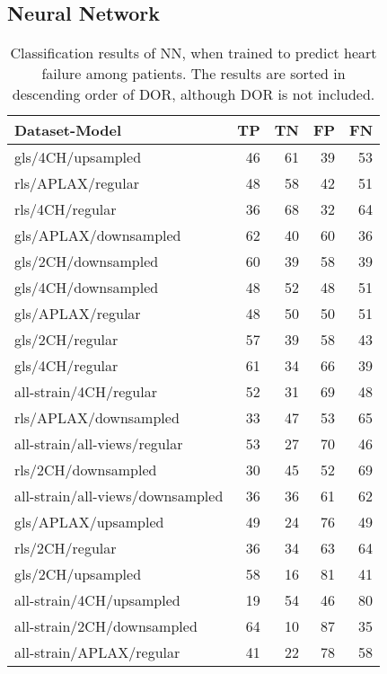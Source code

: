 \subsection{Neural Network}

\begin{longtable}{lrrrr}
    \caption{Classification results of NN, when trained to predict heart failure among patients.
             The results are sorted in descending order of DOR, although DOR is not included.}
    \label{tab:dl_hf_raw_results}\\
    \hline
    Dataset-Model                    & TP & TN & FP & FN \\
    \hline
    gls/4CH/upsampled                & 46 & 61 & 39 & 53 \\
    rls/APLAX/regular                & 48 & 58 & 42 & 51 \\
    rls/4CH/regular                  & 36 & 68 & 32 & 64 \\
    gls/APLAX/downsampled            & 62 & 40 & 60 & 36 \\
    gls/2CH/downsampled              & 60 & 39 & 58 & 39 \\
    gls/4CH/downsampled              & 48 & 52 & 48 & 51 \\
    gls/APLAX/regular                & 48 & 50 & 50 & 51 \\
    gls/2CH/regular                  & 57 & 39 & 58 & 43 \\
    gls/4CH/regular                  & 61 & 34 & 66 & 39 \\
    all-strain/4CH/regular           & 52 & 31 & 69 & 48 \\
    rls/APLAX/downsampled            & 33 & 47 & 53 & 65 \\
    all-strain/all-views/regular     & 53 & 27 & 70 & 46 \\
    rls/2CH/downsampled              & 30 & 45 & 52 & 69 \\
    all-strain/all-views/downsampled & 36 & 36 & 61 & 62 \\
    gls/APLAX/upsampled              & 49 & 24 & 76 & 49 \\
    rls/2CH/regular                  & 36 & 34 & 63 & 64 \\
    gls/2CH/upsampled                & 58 & 16 & 81 & 41 \\
    all-strain/4CH/upsampled         & 19 & 54 & 46 & 80 \\
    all-strain/2CH/downsampled       & 64 & 10 & 87 & 35 \\
    all-strain/APLAX/regular         & 41 & 22 & 78 & 58 \\

\end{longtable}
